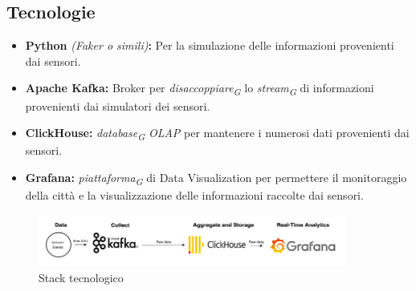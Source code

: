 \subsection{Tecnologie}
\begin{itemize}
    \item \textbf{Python} \textit{(Faker o simili)}\textbf{:} Per la simulazione delle informazioni provenienti dai sensori.
    \item \textbf{Apache Kafka:} Broker per \textit{disaccoppiare}\textsubscript{\textit{G}} lo \textit{stream}\textsubscript{\textit{G}} di informazioni provenienti dai simulatori dei sensori. 
    \item \textbf{ClickHouse:} \textit{database}\textsubscript{\textit{G}} \textit{OLAP} per mantenere i numerosi dati provenienti dai sensori. 
    \item \textbf{Grafana:} \textit{piattaforma}\textsubscript{\textit{G}} di Data Visualization per permettere il monitoraggio della città e la visualizzazione delle informazioni raccolte dai sensori. 
\end{itemize}

\begin{figure}[H]
    \centering
    \includegraphics[width=0.9\textwidth]{../Images/stackTecnologico.PNG}
    \caption{Stack tecnologico}
    \label{fig:stackTecnologico}
\end{figure}
